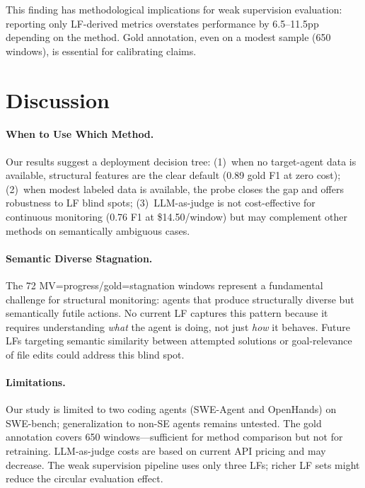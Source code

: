 \documentclass[11pt,a4paper]{article}
\begin{document}
This finding has methodological implications for weak supervision evaluation: reporting only LF-derived metrics overstates performance by 6.5--11.5pp depending on the method.
Gold annotation, even on a modest sample (650 windows), is essential for calibrating claims.

\section{Discussion}

\paragraph{When to Use Which Method.}
Our results suggest a deployment decision tree: (1)~when no target-agent data is available, structural features are the clear default (0.89 gold F1 at zero cost); (2)~when modest labeled data is available, the probe closes the gap and offers robustness to LF blind spots; (3)~LLM-as-judge is not cost-effective for continuous monitoring (0.76 F1 at \$14.50/window) but may complement other methods on semantically ambiguous cases.

\paragraph{Semantic Diverse Stagnation.}
The 72 MV=progress/gold=stagnation windows represent a fundamental challenge for structural monitoring: agents that produce structurally diverse but semantically futile actions.
No current LF captures this pattern because it requires understanding \emph{what} the agent is doing, not just \emph{how} it behaves.
Future LFs targeting semantic similarity between attempted solutions or goal-relevance of file edits could address this blind spot.

\paragraph{Limitations.}
Our study is limited to two coding agents (SWE-Agent and OpenHands) on SWE-bench; generalization to non-SE agents remains untested.
The gold annotation covers 650 windows---sufficient for method comparison but not for retraining.
LLM-as-judge costs are based on current API pricing and may decrease.
The weak supervision pipeline uses only three LFs; richer LF sets might reduce the circular evaluation effect.

\end{document}
